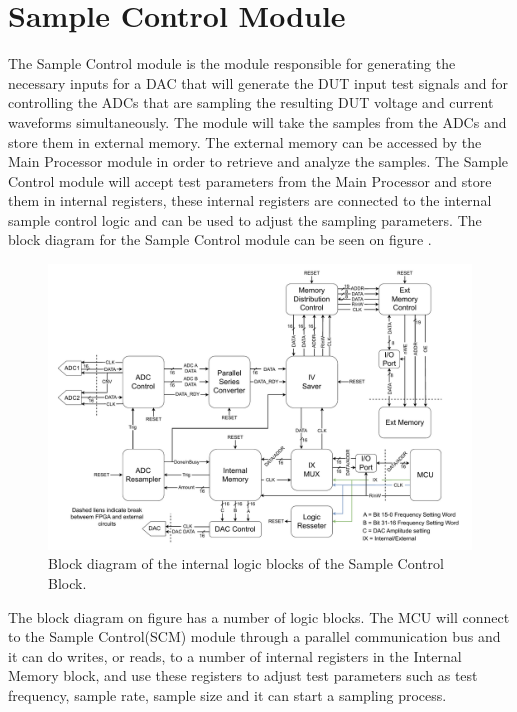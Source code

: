 \chapter{Sample Control Module} \label{sec:SampleControl}
The Sample Control module is the module responsible for generating the necessary inputs for a DAC that will generate the DUT input test signals and for controlling the ADCs that are sampling the resulting DUT voltage and current waveforms simultaneously. The module will take the samples from the ADCs and store them in external memory. The external memory can be accessed by the Main Processor module in order to retrieve and analyze the samples. The Sample Control module will accept test parameters from the Main Processor and store them in internal registers, these internal registers are connected to the internal sample control logic and can be used to adjust the sampling parameters. The block diagram for the Sample Control module can be seen on figure .
\begin{figure}[H]
    \centering
    \includegraphics[clip, trim=0 0 0 0, width=1\textwidth]{Sections/7_SystemDesign/Figures/Sample_Control_Block.pdf}
    \caption{Block diagram of the internal logic blocks of the Sample Control Block.}
    \label{fig:7_SampleControlBlock}
\end{figure}

The block diagram on figure  has a number of logic blocks. The MCU will connect to the Sample Control(SCM) module through a parallel communication bus and it can do writes, or reads, to a number of internal registers in the Internal Memory block, and use these registers to adjust test parameters such as test frequency, sample rate, sample size and it can start a sampling process. 

